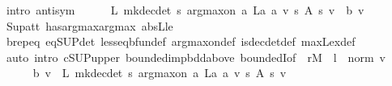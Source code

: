 \begin{isabellebody}
\ {\isacharparenleft}{\kern0pt}intro\ antisym{\isacharparenright}{\kern0pt}\isanewline
\ \ \ \ \isamarkupfalse%
\ {\isachardoublequoteopen}L\ {\isacharparenleft}{\kern0pt}mk{\isacharunderscore}{\kern0pt}dec{\isacharunderscore}{\kern0pt}det\ {\isacharparenleft}{\kern0pt}{\isasymlambda}s{\isachardot}{\kern0pt}\ arg{\isacharunderscore}{\kern0pt}max{\isacharunderscore}{\kern0pt}on\ {\isacharparenleft}{\kern0pt}{\isasymlambda}a{\isachardot}{\kern0pt}\ L\isactrlsub a\ a\ v\ s{\isacharparenright}{\kern0pt}\ {\isacharparenleft}{\kern0pt}A\ s{\isacharparenright}{\kern0pt}{\isacharparenright}{\kern0pt}{\isacharparenright}{\kern0pt}\ v\ {\isasymle}\ {\isasymL}\isactrlsub b\ v{\isachardoublequoteclose}\isanewline
\ \ \ \ \ \ \isamarkupfalse%
\ Sup{\isacharunderscore}{\kern0pt}att\ has{\isacharunderscore}{\kern0pt}arg{\isacharunderscore}{\kern0pt}max{\isacharunderscore}{\kern0pt}arg{\isacharunderscore}{\kern0pt}max\ abs{\isacharunderscore}{\kern0pt}L{\isacharunderscore}{\kern0pt}le\isanewline
\ \ \ \ \ \ \isamarkupfalse%
\ {\isasymL}\isactrlsub b{\isachardot}{\kern0pt}rep{\isacharunderscore}{\kern0pt}eq\ {\isasymL}{\isacharunderscore}{\kern0pt}eq{\isacharunderscore}{\kern0pt}SUP{\isacharunderscore}{\kern0pt}det\ less{\isacharunderscore}{\kern0pt}eq{\isacharunderscore}{\kern0pt}bfun{\isacharunderscore}{\kern0pt}def\ arg{\isacharunderscore}{\kern0pt}max{\isacharunderscore}{\kern0pt}on{\isacharunderscore}{\kern0pt}def\ is{\isacharunderscore}{\kern0pt}dec{\isacharunderscore}{\kern0pt}det{\isacharunderscore}{\kern0pt}def\ max{\isacharunderscore}{\kern0pt}L{\isacharunderscore}{\kern0pt}ex{\isacharunderscore}{\kern0pt}def\isanewline
\ \ \ \ \ \ \isamarkupfalse%
\ {\isacharparenleft}{\kern0pt}auto\ intro{\isacharbang}{\kern0pt}{\isacharcolon}{\kern0pt}\ cSUP{\isacharunderscore}{\kern0pt}upper\ bounded{\isacharunderscore}{\kern0pt}imp{\isacharunderscore}{\kern0pt}bdd{\isacharunderscore}{\kern0pt}above\ boundedI{\isacharbrackleft}{\kern0pt}of\ {\isacharunderscore}{\kern0pt}\ {\isachardoublequoteopen}r\isactrlsub M\ {\isacharplus}{\kern0pt}\ l\ {\isacharasterisk}{\kern0pt}\ norm\ v{\isachardoublequoteclose}{\isacharbrackright}{\kern0pt}{\isacharparenright}{\kern0pt}\isanewline
\ \ \isamarkupfalse%
\isanewline
\ \ \ \ \isamarkupfalse%
\ {\isachardoublequoteopen}{\isasymL}\isactrlsub b\ v\ {\isasymle}\ L\ {\isacharparenleft}{\kern0pt}mk{\isacharunderscore}{\kern0pt}dec{\isacharunderscore}{\kern0pt}det\ {\isacharparenleft}{\kern0pt}{\isasymlambda}s{\isachardot}{\kern0pt}\ arg{\isacharunderscore}{\kern0pt}max{\isacharunderscore}{\kern0pt}on\ {\isacharparenleft}{\kern0pt}{\isasymlambda}a{\isachardot}{\kern0pt}\ L\isactrlsub a\ a\ v\ s{\isacharparenright}{\kern0pt}\ {\isacharparenleft}{\kern0pt}A\ s{\isacharparenright}{\kern0pt}{\isacharparenright}{\kern0pt}{\isacharparenright}{\kern0pt}\ v{\isachardoublequoteclose}\isanewline

\end{isabellebody}
